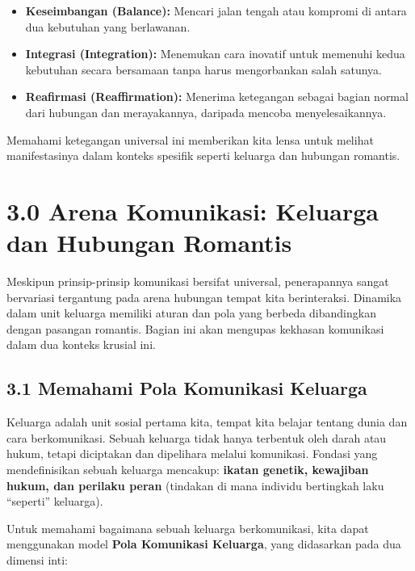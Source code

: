 \documentclass[
  letterpaper,
  DIV=11,
  numbers=noendperiod]{scrreprt}
\providecommand{\tightlist}{%
  \setlength{\itemsep}{0pt}\setlength{\parskip}{0pt}}
\begin{document}
\begin{itemize}
\tightlist
\item
  \textbf{Keseimbangan (Balance):} Mencari jalan tengah atau kompromi di
  antara dua kebutuhan yang berlawanan.
\item
  \textbf{Integrasi (Integration):} Menemukan cara inovatif untuk
  memenuhi kedua kebutuhan secara bersamaan tanpa harus mengorbankan
  salah satunya.
\item
  \textbf{Reafirmasi (Reaffirmation):} Menerima ketegangan sebagai
  bagian normal dari hubungan dan merayakannya, daripada mencoba
  menyelesaikannya.
\end{itemize}

Memahami ketegangan universal ini memberikan kita lensa untuk melihat
manifestasinya dalam konteks spesifik seperti keluarga dan hubungan
romantis.

\section{\texorpdfstring{\textbf{3.0 Arena Komunikasi: Keluarga dan
Hubungan
Romantis}}{3.0 Arena Komunikasi: Keluarga dan Hubungan Romantis}}\label{arena-komunikasi-keluarga-dan-hubungan-romantis}

Meskipun prinsip-prinsip komunikasi bersifat universal, penerapannya
sangat bervariasi tergantung pada arena hubungan tempat kita
berinteraksi. Dinamika dalam unit keluarga memiliki aturan dan pola yang
berbeda dibandingkan dengan pasangan romantis. Bagian ini akan mengupas
kekhasan komunikasi dalam dua konteks krusial ini.

\subsection{\texorpdfstring{\textbf{3.1 Memahami Pola Komunikasi
Keluarga}}{3.1 Memahami Pola Komunikasi Keluarga}}\label{memahami-pola-komunikasi-keluarga}

Keluarga adalah unit sosial pertama kita, tempat kita belajar tentang
dunia dan cara berkomunikasi. Sebuah keluarga tidak hanya terbentuk oleh
darah atau hukum, tetapi diciptakan dan dipelihara melalui komunikasi.
Fondasi yang mendefinisikan sebuah keluarga mencakup: \textbf{ikatan
genetik, kewajiban hukum, dan perilaku peran} (tindakan di mana individu
bertingkah laku ``seperti'' keluarga).

Untuk memahami bagaimana sebuah keluarga berkomunikasi, kita dapat
menggunakan model \textbf{Pola Komunikasi Keluarga}, yang didasarkan
pada dua dimensi inti:
\end{document}
